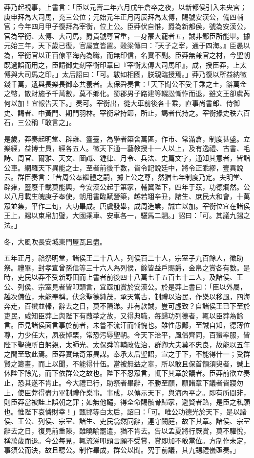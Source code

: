 \begin{pinyinscope}
莽乃起視事，上書言：「臣以元壽二年六月戊午倉卒之夜，以新都侯引入未央宮；庚申拜為大司馬，充三公位；元始元年正月丙辰拜為太傅，賜號安漢公，備四輔官；今年四月甲子復拜為宰衡，位上公。臣莽伏自惟，爵為新都侯，號為安漢公，官為宰衡、太傅、大司馬，爵貴號尊官重，一身蒙大寵者五，誠非鄙臣所能堪。據元始三年，天下歲已復，官屬宜皆置。穀梁傳曰：『天子之宰，通于四海。』臣愚以為，宰衡官以正百僚平海內為職，而無印信，名實不副。臣莽無兼官之材，今聖朝既過誤而用之，臣請御史刻宰衡印章曰『宰衡太傅大司馬印』，成，授臣莽，上太傅與大司馬之印。」太后詔曰：「可。韍如相國，朕親臨授焉。」莽乃復以所益納徵錢千萬，遺與長樂長御奉共養者。太保舜奏言：「天下聞公不受千乘之土，辭萬金之幣，散財施予千萬數，莫不鄉化。蜀郡男子路建等輟訟慚怍而退，雖文王卻虞芮何以加！宜報告天下。」奏可。宰衡出，從大車前後各十乘，直事尚書郎、侍御史、謁者、中黃門、期門羽林。宰衡常持節，所止，謁者代持之。宰衡掾史秩六百石，三公稱「敢言之」。

是歲，莽奏起明堂、辟雍、靈臺，為學者築舍萬區，作市、常滿倉，制度甚盛。立樂經，益博士員，經各五人。徵天下通一藝教授十一人以上，及有逸禮、古書、毛詩、周官、爾雅、天文、圖讖、鍾律、月令、兵法、史篇文字，通知其意者，皆詣公車。網羅天下異能之士，至者前後千數，皆令記說廷中，將令正乖繆，壹異說云。群臣奏言：「昔周公奉繼體之嗣，據上公之尊，然猶七年制度乃定。夫明堂、辟雍，墮廢千載莫能興，今安漢公起于第家，輔翼陛下，四年于茲，功德爛然。公以八月載生魄庚子奉使，朝用書臨賦營築，越若翊辛丑，諸生、庶民大和會，十萬眾並集，平作二旬，大功畢成。唐虞發舉，成周造業，誠亡以加。宰衡位宜在諸侯王上，賜以束帛加璧，大國乘車、安車各一，驪馬二駟。」詔曰：「可。其議九錫之法。」

冬，大風吹長安城東門屋瓦且盡。

五年正月，祫祭明堂，諸侯王二十八人，列侯百二十人，宗室子九百餘人，徵助祭。禮畢，封孝宣曾孫信等三十六人為列侯，餘皆益戶賜爵，金帛之賞各有數。是時，吏民以莽不受新野田而上書者前後四十八萬七千五百七十二人，及諸侯、王公、列侯、宗室見者皆叩頭言，宜亟加賞於安漢公。於是莽上書曰：「臣以外屬，越次備位，未能奉稱。伏念聖德純茂，承天當古，制禮以治民，作樂以移風，四海奔走，百蠻並轃，辭去之日，莫不隕涕。非有款誠，豈可虛致？自諸侯王已下至於吏民，咸知臣莽上與陛下有葭莩之故，又得典職，每歸功列德者，輒以臣莽為餘言。臣見諸侯面言事於前者，未嘗不流汗而慚愧也。雖性愚鄙，至誠自知，德薄位尊，力少任大，夙夜悼栗，常恐污辱聖朝。今天下治平，風俗齊同，百蠻率服，皆陛下聖德所自躬親，太師光、太保舜等輔政佐治，群卿大夫莫不忠良，故能以五年之間至致此焉。臣莽實無奇策異謀。奉承太后聖詔，宣之于下，不能得什一；受群賢之籌畫，而上以聞，不能得什伍。當被無益之辜，所以敢且保首領須臾者，誠上休陛下餘光，而下依群公之故也。陛下不忍眾言，輒下其章於議者。臣莽前欲立奏止，恐其遂不肯止。今大禮已行，助祭者畢辭，不勝至願，願諸章下議者皆寢勿上，使臣莽得盡力畢制禮作樂事。事成，以傳示天下，與海內平之。即有所間非，則臣莽當被詿上誤朝之罪；如無他譴，得全命賜骸骨歸家，避賢者路，是臣之私願也。惟陛下哀憐財幸！」甄邯等白太后，詔曰：「可。唯公功德光於天下，是以諸侯、王公、列侯、宗室、諸生、吏民翕然同辭，連守闕庭，故下其章。諸侯、宗室辭去之日，復見前重陳，雖曉喻罷遣，猶不肯去。告以孟夏將行厥賞，莫不驩悅，稱萬歲而退。今公每見，輒流涕叩頭言願不受賞，賞即加不敢當位。方制作未定，事須公而決，故且聽公。制作畢成，群公以聞。究于前議，其九錫禮儀亟奏。」


\end{pinyinscope}
